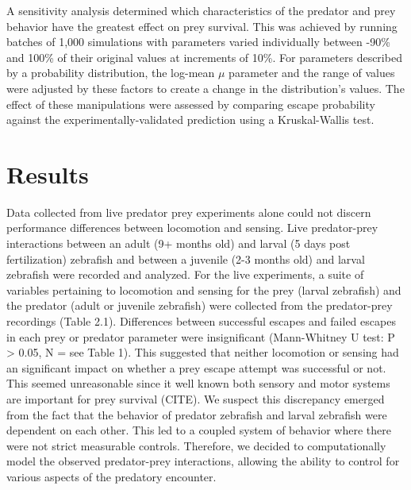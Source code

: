 \documentclass[]{rsos}%
\begin{document}
A sensitivity analysis determined which characteristics of the predator and prey behavior have the greatest effect on prey survival. 
This was achieved by running batches of 1,000 simulations with parameters varied individually between -90\% and 100\% of their original values at increments of 10\%.
For parameters described by a probability distribution, the log-mean $\mu$ parameter and the range of values were adjusted by these factors to create a change in the distribution's values.
The effect of these manipulations were assessed by comparing escape probability against the experimentally-validated prediction using a Kruskal-Wallis test. 


\section{Results} %


Data collected from live predator prey experiments alone could not discern performance differences between locomotion and sensing. Live predator-prey interactions between an adult (9+ months old) and larval (5 days post fertilization) zebrafish and between a juvenile (2-3 months old) and larval zebrafish were recorded and analyzed. For the live experiments, a suite of variables pertaining to locomotion and sensing for the prey (larval zebrafish) and the predator (adult or juvenile zebrafish) were collected from the predator-prey recordings (Table 2.1). Differences between successful escapes and failed escapes in each  prey or predator parameter were insignificant (Mann-Whitney U test: P > 0.05, N = see Table 1). This suggested that neither locomotion or sensing had an significant impact on whether a prey escape attempt was successful or not. This seemed unreasonable since it well known both sensory and motor systems are important for prey survival (CITE). We suspect this discrepancy emerged from the fact that the behavior of predator zebrafish and larval zebrafish were dependent on each other. This led to a coupled system of behavior where there were not strict measurable controls. Therefore, we decided to computationally model the observed predator-prey interactions, allowing the ability to control for various aspects of the predatory encounter.
\end{document}
